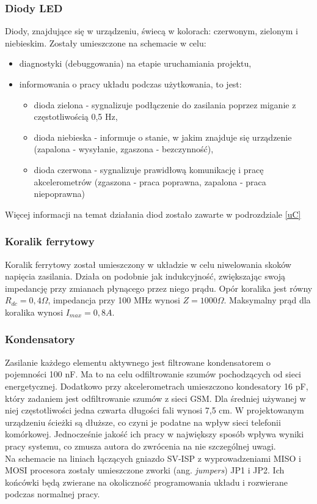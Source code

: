 \subsubsection{Diody LED}
Diody, znajdujące się w urządzeniu, świecą w kolorach: czerwonym, zielonym i niebieskim. Zostały umieszczone na schemacie w celu:
\begin{itemize}
	\item diagnostyki (debuggowania) na etapie uruchamiania projektu,
	\item informowania o pracy układu podczas użytkowania, to jest:
		\begin{itemize}
			\item dioda zielona - sygnalizuje podłączenie do zasilania poprzez miganie z częstotliwością 0,5 Hz,
			\item dioda niebieska - informuje o stanie, w jakim znajduje się urządzenie (zapalona - wysyłanie, zgaszona - bezczynność),
			\item dioda czerwona - sygnalizuje prawidłową komunikację i pracę akcelerometrów (zgaszona - praca poprawna, zapalona - praca niepoprawna)
		\end{itemize}
\end{itemize}
Więcej informacji na temat działania diod zostało zawarte w podrozdziale \ref{uC}

\subsubsection{Koralik ferrytowy}
Koralik ferrytowy został umieszczony w układzie w celu niwelowania skoków napięcia zasilania. Działa on podobnie jak indukcyjność, zwiększając swoją impedancję przy zmianach płynącego przez niego prądu. Opór koralika jest równy $R_{dc}=0,4\Omega$, impedancja przy 100 MHz wynosi $Z=1000\Omega$. Maksymalny prąd dla koralika wynosi $I_{max}=0,8 A$.
\subsubsection{Kondensatory}
Zasilanie każdego elementu aktywnego jest filtrowane kondensatorem o pojemności 100 nF. Ma to na celu odfiltrowanie szumów pochodzących od sieci energetycznej. Dodatkowo przy akcelerometrach umieszczono kondesatory 16 pF, który zadaniem jest odfiltrowanie szumów z sieci GSM. Dla średniej używanej w niej częstotliwości jedna czwarta długości fali wynosi 7,5 cm. W projektowanym urządzeniu ścieżki są dłuższe, co czyni je podatne na wpływ sieci telefonii komórkowej. Jednocześnie jakość ich pracy w największy sposób wpływa wyniki pracy systemu, co zmusza autora do zwrócenia na nie szczególnej uwagi.
$$ \, $$
Na schemacie na liniach łączących gniazdo SV-ISP z wyprowadzeniami MISO i MOSI procesora zostały umieszczone zworki (ang. \textit{jumpers}) JP1 i JP2. Ich końcówki będą zwierane na okoliczność programowania układu i rozwierane podczas normalnej pracy.


